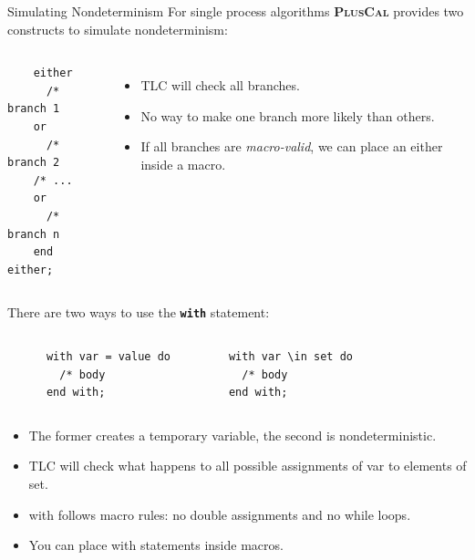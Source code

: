 \documentclass[10pt]{beamer}
\newcommand{\pluscal}{\textbf{\textsc{PlusCal}}\xspace}
\begin{document}
\begin{frame}{Simulating Nondeterminism}
  For single process algorithms \pluscal provides two constructs to simulate nondeterminism:

  \framebreak

  \begin{columns}[T,onlytextwidth]

    \begin{verbatim}
    either
      /* branch 1
    or
      /* branch 2
    /* ...
    or
      /* branch n
    end either;
    \end{verbatim}


    \begin{itemize}
      \item TLC will check all branches.
      \item No way to make one branch more likely than others.
      \item If all branches are \emph{macro-valid}, we can place an either inside a macro.
    \end{itemize}
  \end{columns}

  \framebreak

  There are two ways to use the \textbf{\texttt{with}} statement:
  
  \begin{columns}[T,onlytextwidth]

    \begin{verbatim}
      with var = value do
        /* body
      end with;
    \end{verbatim}


    \begin{verbatim}
      with var \in set do
        /* body
      end with;
    \end{verbatim}
    
  \end{columns}

  \begin{itemize}
    \item The former creates a temporary variable, the second is nondeterministic.
    \item TLC will check what happens to all possible assignments of var to elements of set.
    \item with follows \alert{macro rules}: no double assignments and no while loops.
    \item You can place with statements inside macros.
  \end{itemize}
  
\end{frame}
\end{document}
